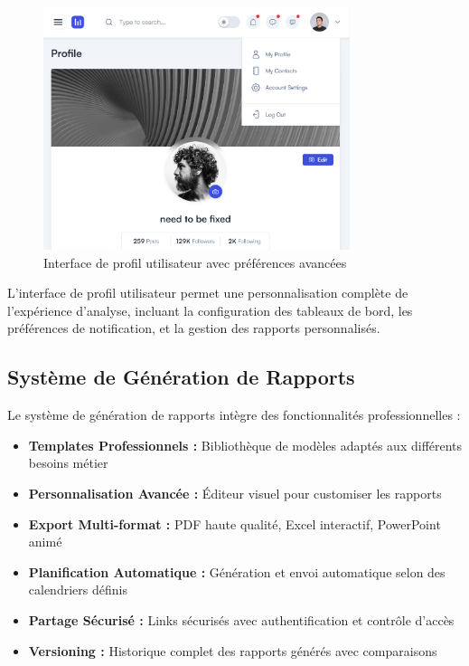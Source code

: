 \begin{figure}[H]
\centering
\includegraphics[width=0.8\textwidth]{assets/images/light-profile.png}
\caption{Interface de profil utilisateur avec préférences avancées}
\label{fig:user-profile-interface}
\end{figure}

L'interface de profil utilisateur permet une personnalisation complète de l'expérience d'analyse, incluant la configuration des tableaux de bord, les préférences de notification, et la gestion des rapports personnalisés.

\subsection{Système de Génération de Rapports}

Le système de génération de rapports intègre des fonctionnalités professionnelles :

\begin{itemize}
    \item \textbf{Templates Professionnels :} Bibliothèque de modèles adaptés aux différents besoins métier
    \item \textbf{Personnalisation Avancée :} Éditeur visuel pour customiser les rapports
    \item \textbf{Export Multi-format :} PDF haute qualité, Excel interactif, PowerPoint animé
    \item \textbf{Planification Automatique :} Génération et envoi automatique selon des calendriers définis
    \item \textbf{Partage Sécurisé :} Links sécurisés avec authentification et contrôle d'accès
    \item \textbf{Versioning :} Historique complet des rapports générés avec comparaisons
\end{itemize}

